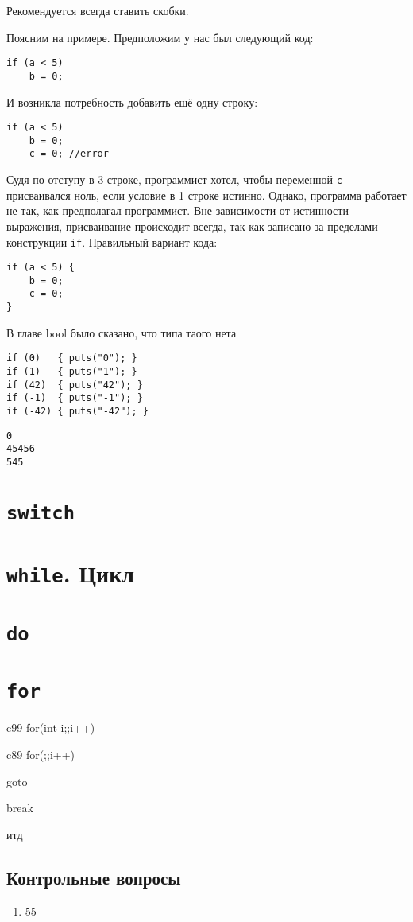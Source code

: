 \documentclass[myc.tex]{subfiles}
\begin{document}
Рекомендуется всегда ставить скобки.


Поясним на примере. Предположим у нас был следующий код:
\begin{lstlisting}
if (a < 5)
    b = 0;
\end{lstlisting}

И возникла потребность добавить ещё одну строку:
\begin{lstlisting}
if (a < 5)
    b = 0;
    c = 0; //error
\end{lstlisting}

Судя по отступу в 3 строке, программист хотел, чтобы переменной \texttt{c} присваивался ноль, если условие в 1 строке истинно. Однако, программа работает не так, как предполагал программист. Вне зависимости от истинности выражения, присваивание происходит всегда, так как записано за пределами конструкции \texttt{if}. Правильный вариант кода:
\begin{lstlisting}
if (a < 5) {
    b = 0;
    c = 0;
}
\end{lstlisting}




В главе bool было сказано, что типа таого нета

\begin{lstlisting}
if (0)   { puts("0"); }
if (1)   { puts("1"); }
if (42)  { puts("42"); }
if (-1)  { puts("-1"); }
if (-42) { puts("-42"); }
\end{lstlisting}

\begin{verbatim}
0
45456
545
\end{verbatim} 


\section{\texttt{switch}}

\section{\texttt{while}. Цикл}

\section{\texttt{do}}

\section{\texttt{for}}



c99 for(int i;;i++)

c89 for(;;i++)


goto

break

итд








\subsection*{Контрольные вопросы}
\begin{enumerate}
\item 55
\end{enumerate}
\end{document}
